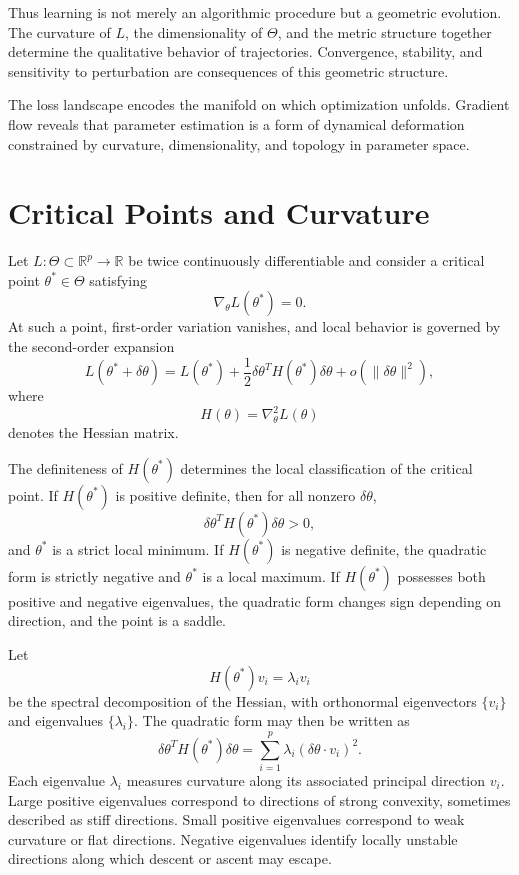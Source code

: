 \documentclass[12pt]{book}
\begin{document}
Thus learning is not merely an algorithmic procedure but a geometric evolution. The curvature of $L$, the dimensionality of $\Theta$, and the metric structure together determine the qualitative behavior of trajectories. Convergence, stability, and sensitivity to perturbation are consequences of this geometric structure.

The loss landscape encodes the manifold on which optimization unfolds. Gradient flow reveals that parameter estimation is a form of dynamical deformation constrained by curvature, dimensionality, and topology in parameter space.

\section{Critical Points and Curvature}

Let $L : \Theta \subset \mathbb{R}^p \to \mathbb{R}$ be twice continuously differentiable and consider a critical point $\theta^\ast \in \Theta$ satisfying
\[
\nabla_\theta L(\theta^\ast) = 0.
\]
At such a point, first-order variation vanishes, and local behavior is governed by the second-order expansion
\[
L(\theta^\ast + \delta \theta)
=
L(\theta^\ast)
+
\frac{1}{2}
\delta \theta^{T}
H(\theta^\ast)
\delta \theta
+
o(\|\delta \theta\|^2),
\]
where
\[
H(\theta) = \nabla_\theta^2 L(\theta)
\]
denotes the Hessian matrix.

The definiteness of $H(\theta^\ast)$ determines the local classification of the critical point. If $H(\theta^\ast)$ is positive definite, then for all nonzero $\delta \theta$,
\[
\delta \theta^{T} H(\theta^\ast) \delta \theta > 0,
\]
and $\theta^\ast$ is a strict local minimum. If $H(\theta^\ast)$ is negative definite, the quadratic form is strictly negative and $\theta^\ast$ is a local maximum. If $H(\theta^\ast)$ possesses both positive and negative eigenvalues, the quadratic form changes sign depending on direction, and the point is a saddle.

Let
\[
H(\theta^\ast) v_i = \lambda_i v_i
\]
be the spectral decomposition of the Hessian, with orthonormal eigenvectors $\{v_i\}$ and eigenvalues $\{\lambda_i\}$. The quadratic form may then be written as
\[
\delta \theta^{T} H(\theta^\ast) \delta \theta
=
\sum_{i=1}^p
\lambda_i
(\delta \theta \cdot v_i)^2.
\]
Each eigenvalue $\lambda_i$ measures curvature along its associated principal direction $v_i$. Large positive eigenvalues correspond to directions of strong convexity, sometimes described as stiff directions. Small positive eigenvalues correspond to weak curvature or flat directions. Negative eigenvalues identify locally unstable directions along which descent or ascent may escape.
\end{document}
